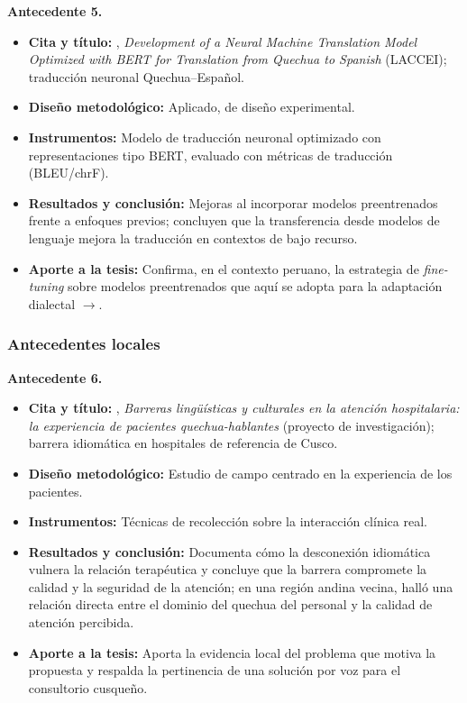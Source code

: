 \begin{bloqueObsDos}
\noindent\textbf{Antecedente 5.}
\begin{itemize}\setlength{\itemsep}{1pt}
  \item \textbf{Cita y t{\'i}tulo:} \textcite{CuevaMedina2024}, \emph{Development of a Neural Machine Translation Model Optimized with BERT for Translation from Quechua to Spanish} (LACCEI); traducci{\'o}n neuronal Quechua--Espa{\~n}ol.
  \item \textbf{Dise{\~n}o metodol{\'o}gico:} Aplicado, de dise{\~n}o experimental.
  \item \textbf{Instrumentos:} Modelo de traducci{\'o}n neuronal optimizado con representaciones tipo BERT, evaluado con m{\'e}tricas de traducci{\'o}n (BLEU/chrF).
  \item \textbf{Resultados y conclusi{\'o}n:} Mejoras al incorporar modelos preentrenados frente a enfoques previos; concluyen que la transferencia desde modelos de lenguaje mejora la traducci{\'o}n en contextos de bajo recurso.
  \item \textbf{Aporte a la tesis:} Confirma, en el contexto peruano, la estrategia de \emph{fine-tuning} sobre modelos preentrenados que aqu{\'i} se adopta para la adaptaci{\'o}n dialectal $\to$.
\end{itemize}
\end{bloqueObsDos}

\subsubsection{Antecedentes locales}
\begin{bloqueObsDos}
\noindent\textbf{Antecedente 6.}
\begin{itemize}\setlength{\itemsep}{1pt}
  \item \textbf{Cita y t{\'i}tulo:} \textcite{begazo2026}, \emph{Barreras ling{\"u}{\'i}sticas y culturales en la atenci{\'o}n hospitalaria: la experiencia de pacientes quechua-hablantes} (proyecto de investigaci{\'o}n); barrera idiom{\'a}tica en hospitales de referencia de Cusco.
  \item \textbf{Dise{\~n}o metodol{\'o}gico:} Estudio de campo centrado en la experiencia de los pacientes.
  \item \textbf{Instrumentos:} T{\'e}cnicas de recolecci{\'o}n sobre la interacci{\'o}n cl{\'i}nica real.
  \item \textbf{Resultados y conclusi{\'o}n:} Documenta c{\'o}mo la desconexi{\'o}n idiom{\'a}tica vulnera la relaci{\'o}n terap{\'e}utica y concluye que la barrera compromete la calidad y la seguridad de la atenci{\'o}n; en una regi{\'o}n andina vecina, \textcite{cuaila2022} hall{\'o} una relaci{\'o}n directa entre el dominio del quechua del personal y la calidad de atenci{\'o}n percibida.
  \item \textbf{Aporte a la tesis:} Aporta la evidencia local del problema que motiva la propuesta y respalda la pertinencia de una soluci{\'o}n por voz para el consultorio cusque{\~n}o.
\end{itemize}
\end{bloqueObsDos}

